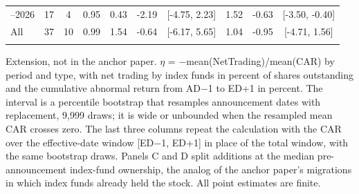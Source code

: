 \begin{threeparttable}
\begin{tabular}{@{}lccccccccc}
\addlinespace[0.25ex]
\addlinespace[0.25ex]
2022–2026 & 17 & 4 & 0.95 & 0.43 & -2.19 & [-4.75, 2.23] & 1.52 & -0.63 & [-3.50, -0.40] \\
\addlinespace[0.25ex]
\addlinespace[0.25ex]
All & 37 & 10 & 0.99 & 1.54 & -0.64 & [-6.17, 5.65] & 1.04 & -0.95 & [-4.71, 1.56] \\
\addlinespace[0.25ex]
\bottomrule
\end{tabular}
\endgroup
\noindent\begin{minipage}{\linewidth}\smallskip\footnotesize
Extension, not in the anchor paper. $\eta$ = $-$mean(NetTrading)/mean(CAR) by period and type, with net trading by index funds in percent of shares outstanding and the cumulative abnormal return from AD$-$1 to ED+1 in percent. The interval is a percentile bootstrap that resamples announcement dates with replacement, 9,999 draws; it is wide or unbounded when the resampled mean CAR crosses zero. The last three columns repeat the calculation with the CAR over the effective-date window [ED$-$1, ED+1] in place of the total window, with the same bootstrap draws. Panels C and D split additions at the median pre-announcement index-fund ownership, the analog of the anchor paper's migrations in which index funds already held the stock. All point estimates are finite.\end{minipage}

\end{threeparttable}
